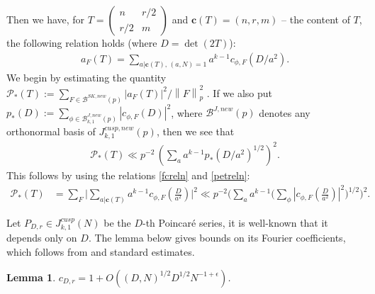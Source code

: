 \documentclass[11pt]{amsart}
\numberwithin{equation}{section}
\theoremstyle{plain}
\newtheorem{lem}[thm]{Lemma}
\theoremstyle{definition}
\newcommand{\mf}{\mathbf}
\newcommand{\mc}{\mathcal}
\newcommand*{\norm}[1]{\left\lVert#1\right\rVert}
\newcommand{\sumn}{\sum \nolimits}
\newcommand{\smat}[4]{\left( \begin{smallmatrix}#1&#2\\#3&#4\end{smallmatrix}\right)}
\newcommand{\jkn}{J^{cusp}_{k,1}(N)}
\begin{document}
Then we have, for $T = \smat{n}{r/2}{r/2}{m}$ and $\mf c(T) = (n,r,m)$ -- the content of $T$, the following relation holds (where $D= \det(2T)$):
\begin{align} \label{fcreln}
    a_F(T) =  \sumn_{a|\mf c(T), \, (a,N)=1} a^{k-1}  c_{\phi,F}\left( D/a^2 \right).
\end{align}
We begin by estimating the quantity $\mathcal{P}_*(T):= \sum_{F \in \mc B^{SK, new}(p) } |a_{F}(T)|^2/\norm{F}^2_p$ . If we also put 
    $p_*(D) := \sum_{\phi \in \mc B^{J,new}_{k,1}(p)}  |c_{\phi,F}(D)|^2$, where $\mc B^{J,new}(p)$ denotes any orthonormal basis of $J_{k,1}^{cusp,new}(p)$, then we see that 
    \begin{align}
        \mathcal{P}_*(T)  \ll p^{-2} \, ( \sumn_a a^{k-1} p_*(D/a^2)^{1/2} )^2.
    \end{align}
    This follows by using the relations \eqref{fcreln} and \eqref{petreln}:
\begin{equation}
    \begin{split}
      \mathcal{P}_*(T)&= \sumn_F \Big| \sumn_{a|\mf c(T)} a^{k-1}  c_{\phi,F}\left( \frac{D }{a^2} \right) \Big|^2 \ll p^{-2} \Big( \sumn_a a^{k-1} \big( \sumn_\phi |c_{\phi,F}\left( \frac{D }{a^2} \right) |^2 \big)^{1/2} \Big)^2.
    \end{split}
\end{equation}

Let $P_{D,r} \in \jkn$ be the $D$-th Poincar\'e series, it is well-known that it depends only on $D$. The lemma below gives bounds on its Fourier coefficients, which follows from \cite[Thm.~3.23]{Br} and standard estimates.
\begin{lem}\label{poincareN}
$c_{D,r} = 1 + O((D,N)^{1/2}D^{1/2} N^{-1+\epsilon})$. 
\end{lem}
\end{document}

